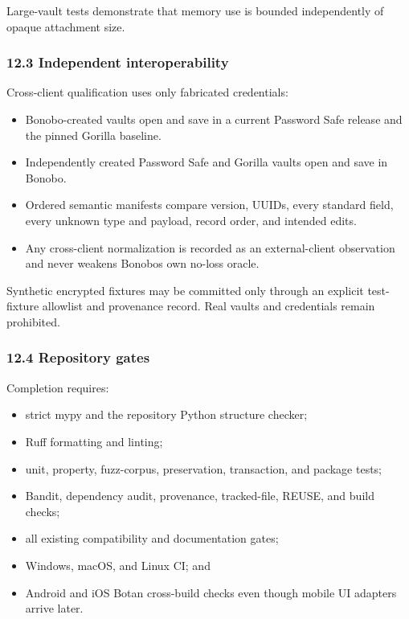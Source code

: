 \documentclass[
  letterpaper,
]{article}
\providecommand{\tightlist}{%
  \setlength{\itemsep}{0pt}\setlength{\parskip}{0pt}}
\begin{document}
Large-vault tests demonstrate that memory use is bounded independently of opaque attachment size.

\subsubsection{12.3 Independent interoperability}\label{123-independent-interoperability}

Cross-client qualification uses only fabricated credentials:

\begin{itemize}
\tightlist
\item
  Bonobo-created vaults open and save in a current Password Safe release and the pinned Gorilla baseline.
\item
  Independently created Password Safe and Gorilla vaults open and save in Bonobo.
\item
  Ordered semantic manifests compare version, UUIDs, every standard field, every unknown type and payload, record order,
  and intended edits.
\item
  Any cross-client normalization is recorded as an external-client observation and never weakens
  Bonobo\textquotesingle s own no-loss oracle.
\end{itemize}

Synthetic encrypted fixtures may be committed only through an explicit test-fixture allowlist and provenance record.
Real vaults and credentials remain prohibited.

\subsubsection{12.4 Repository gates}\label{124-repository-gates}

Completion requires:

\begin{itemize}
\tightlist
\item
  strict mypy and the repository Python structure checker;
\item
  Ruff formatting and linting;
\item
  unit, property, fuzz-corpus, preservation, transaction, and package tests;
\item
  Bandit, dependency audit, provenance, tracked-file, REUSE, and build checks;
\item
  all existing compatibility and documentation gates;
\item
  Windows, macOS, and Linux CI; and
\item
  Android and iOS Botan cross-build checks even though mobile UI adapters arrive later.
\end{itemize}
\end{document}
